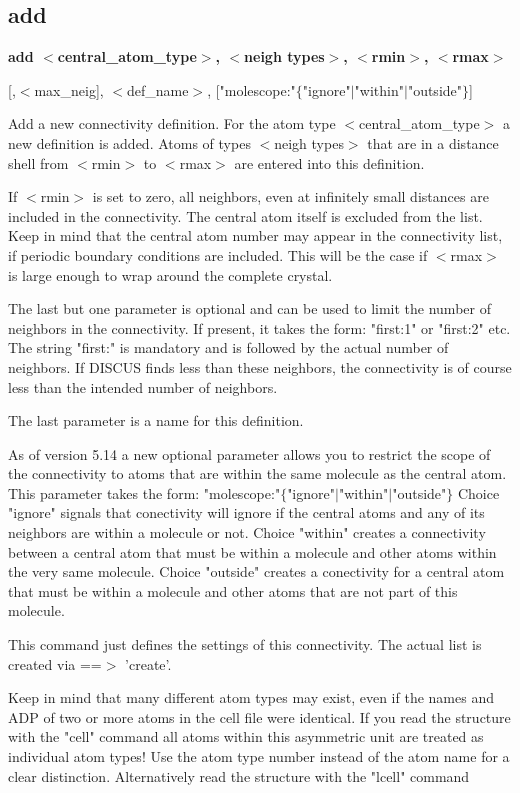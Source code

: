 \subsection*{add}
{\bf add $ <$central\_atom\_type$> $, $ <$neigh types$> $, $ <$rmin$> $, $ <$rmax$> $ \par }
\vspace{3pt}
    [,$ <$max\_neig], $ <$def\_name$> $, 
    ["molescope:"$ \{$"ignore"$| $"within"$| $"outside"$\} $] 
\par
Add a new connectivity definition. 
For the atom type $ <$central\_atom\_type$> $ a new definition is 
added. Atoms of types $ <$neigh types$> $ that are in a distance shell 
from $ <$rmin$> $ to $ <$rmax$> $ are entered into this definition. 
\par
If $ <$rmin$> $ is set to zero, all neighbors, even at infinitely small 
distances are included in the connectivity. The central atom itself 
is excluded from the list. 
Keep in mind that the central atom number may appear in the 
connectivity list, if periodic boundary conditions are included. 
This will be the case if $ <$rmax$> $ is large enough to wrap around 
the complete crystal. 
\par
The last but one parameter is optional and can be used to limit the 
number of neighbors in the connectivity. If present, it takes the 
form: "first:1" or "first:2" etc. The string "first:" is mandatory 
and is followed by the actual number of neighbors. If DISCUS finds 
less than these neighbors, the connectivity is of course less than 
the intended number of neighbors. 
\par
The last parameter is a name for this definition. 
\par
As of version 5.14 a new optional parameter allows you to restrict 
the scope of the connectivity to atoms that are within the same 
molecule as the central atom. This parameter takes the form: 
"molescope:"$ \{$"ignore"$| $"within"$| $"outside"$\} $ 
   Choice "ignore" signals that conectivity will ignore if the 
   central atoms and any of its neighbors are within a molecule 
   or not. 
   Choice "within" creates a connectivity between a central atom 
   that must be within a molecule and other atoms within the 
   very same molecule. 
   Choice "outside" creates a conectivity for a central atom 
   that must be within a molecule and other atoms that are 
   not part of this molecule. 
\par
This command just defines the settings of this connectivity. The 
actual list is created via ==$> $ 'create'. 
\par
Keep in mind that many different atom types may exist, even if 
the names and ADP of two or more atoms in the cell file were 
identical. If you read the structure with the "cell" command 
all atoms within this asymmetric unit are treated as individual 
atom types! Use the atom type number instead of the atom name 
for a clear distinction. 
Alternatively read the structure with the "lcell" command 

